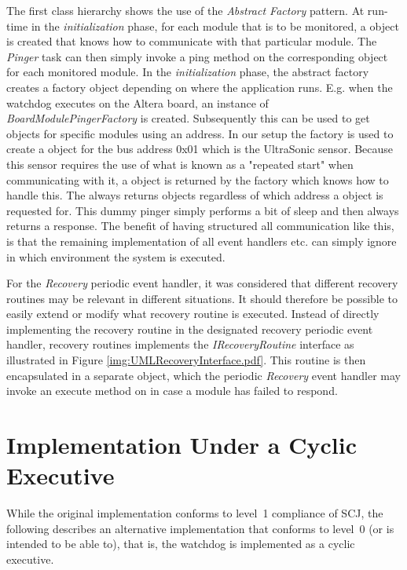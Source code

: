 The first class hierarchy shows the use of the \textit{Abstract Factory} pattern. At run-time in the \textit{initialization} phase, for each module that is to be monitored, a  object is created that knows how to communicate with that particular module. The \textit{Pinger} task can then simply invoke a ping method on the corresponding  object for each monitored module. In the \textit{initialization} phase, the abstract factory creates a factory object depending on where the application runs. E.g. when the watchdog executes on the Altera board, an instance of \emph{BoardModulePingerFactory} is created. Subsequently this can be used to get  objects for specific modules using an \iic address. In our setup the factory is used to create a  object for the \iic bus address 0x01 which is the UltraSonic sensor. Because this sensor requires the use of what is known as a "repeated start" when communicating with it, a  object is returned by the factory which knows how to handle this.
The  always returns   objects regardless of which \iic address a  object is requested for. This dummy pinger simply performs a bit of sleep and then always returns a response. The benefit of having structured all communication like this, is that the remaining implementation of all event handlers etc. can simply ignore in which environment the system is executed.

For the \textit{Recovery} periodic event handler, it was considered that different recovery routines may be relevant in different situations. It should therefore be possible to easily extend or modify what recovery routine is executed. Instead of directly implementing the recovery routine in the designated recovery periodic event handler, recovery routines implements the \emph{IRecoveryRoutine} interface as illustrated in Figure \ref{img:UMLRecoveryInterface.pdf}. This routine is then encapsulated in a separate object, which the periodic \textit{Recovery} event handler may invoke an execute method on in case a module has failed to respond.


\section{Implementation Under a Cyclic Executive} %
\label{sec:implementing_the_watchdog_as_a_cyclic_executive}
While the original implementation conforms to level~1 compliance of SCJ, the following describes an alternative implementation that conforms to level~0 (or is intended to be able to), that is, the watchdog is implemented as a cyclic executive.

